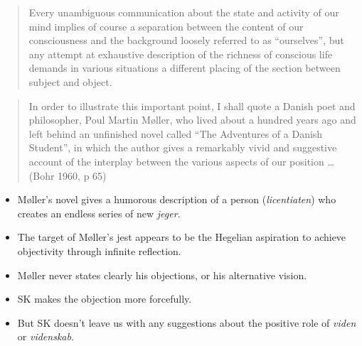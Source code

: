\documentclass[ignorenonframetext, ]{beamer}
\begin{document}
\begin{frame}

  \begin{quote}
    Every unambiguous communication about the state and activity of
    our mind implies of course a separation between the content of our
    consciousness and the background loosely referred to as
    ``ourselves'', but any attempt at exhaustive description of the
    richness of conscious life demands in various situations a
    different placing of the section between subject and
    object. \end{quote}

  \end{frame}
  \begin{frame}

    \begin{quote} In order to illustrate this important point, I shall
      quote a Danish poet and philosopher, Poul Martin Møller, who
      lived about a hundred years ago and left behind an unfinished
      novel called ``The Adventures of a Danish Student'', in which
      the author gives a remarkably vivid and suggestive account of
      the interplay between the various aspects of our position \dots
      (Bohr 1960, p 65)
  \end{quote}
\end{frame}

\begin{frame}

  \begin{itemize}
  \item Møller's novel gives a humorous description of a person
    (\emph{licentiaten}) who creates an endless series of new
    \emph{jeger}.
  \item The target of Møller's jest appears to be the Hegelian
    aspiration to achieve objectivity through infinite reflection.
  \item Møller never states clearly his objections, or his alternative
    vision.
  \item SK makes the objection more forcefully.
  \item But SK doesn't leave us with any suggestions about the
    positive role of \emph{viden} or \emph{videnskab}.
  \end{itemize}

\end{frame}
\end{document}
